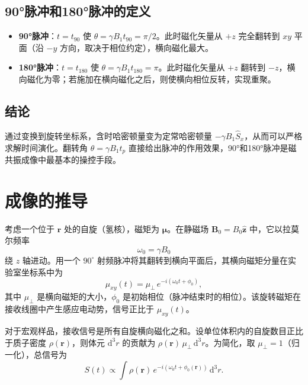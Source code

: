 \documentclass[12pt,a4paper]{article}
\begin{document}
	\subsection{90°脉冲和180°脉冲的定义}
	\begin{itemize}
		\item \textbf{90°脉冲}：$t = t_{90}$ 使 $\theta = \gamma B_1 t_{90} = \pi/2$。此时磁化矢量从 $+z$ 完全翻转到 $xy$ 平面（沿 $-y$ 方向，取决于相位约定），横向磁化最大。
		\item \textbf{180°脉冲}：$t = t_{180}$ 使 $\theta = \gamma B_1 t_{180} = \pi$。此时磁化矢量从 $+z$ 翻转到 $-z$，横向磁化为零；若施加在横向磁化之后，则使横向相位反转，实现重聚。
	\end{itemize}
	
	\subsection{结论}
	通过变换到旋转坐标系，含时哈密顿量变为定常哈密顿量 $-\gamma B_1 \hat{S}_x$，从而可以严格求解时间演化。翻转角 $\theta = \gamma B_1 t_p$ 直接给出脉冲的作用效果，90°和180°脉冲是磁共振成像中最基本的操控手段。
	
	\section{成像的推导}
	
	考虑一个位于 $\mathbf{r}$ 处的自旋（氢核），磁矩为 $\boldsymbol{\mu}$。在静磁场 $\mathbf{B}_0 = B_0 \hat{\mathbf{z}}$ 中，它以拉莫尔频率
	\begin{equation}
		\omega_0 = \gamma B_0
	\end{equation}
	绕 $z$ 轴进动。用一个 $90^\circ$ 射频脉冲将其翻转到横向平面后，其横向磁矩分量在实验室坐标系中为
	\begin{equation}
		\mu_{xy}(t) = \mu_\perp \, e^{-i(\omega_0 t + \phi_0)},
	\end{equation}
	其中 $\mu_\perp$ 是横向磁矩的大小，$\phi_0$ 是初始相位（脉冲结束时的相位）。该旋转磁矩在接收线圈中产生感应电动势，信号正比于 $\mu_{xy}(t)$。
	
	对于宏观样品，接收信号是所有自旋横向磁化之和。设单位体积内的自旋数目正比于质子密度 $\rho(\mathbf{r})$，则体元 $\mathrm{d}^3r$ 的贡献为 $\rho(\mathbf{r})\,\mu_\perp\,\mathrm{d}^3r$。为简化，取 $\mu_\perp=1$（归一化），总信号为
	\begin{equation}
		S(t) \propto \int \rho(\mathbf{r})\, e^{-i(\omega_0 t + \phi_0(\mathbf{r}))}\, \mathrm{d}^3r.
	\end{equation}
	
\end{document}
